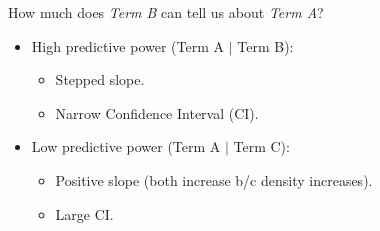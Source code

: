 \documentclass[aspectratio=169, 9pt]{beamer}
\begin{document}
\begin{frame}[c]
	
	\begin{minipage}[t]{.48\linewidth}
	\large\alert{How much does \textit{Term B} can tell us about \textit{Term A}?}\normalsize\pause
	
	\begin{itemize}
		\item<2-> High predictive power (Term A $|$ Term B):
		\begin{itemize}
			\item<3-> Stepped slope.
			\item<3-> Narrow Confidence Interval (CI).
		\end{itemize}
		\item<4-> Low predictive power (Term A $|$ Term C):
		\begin{itemize}
			\item<5-> Positive slope (both increase b/c density increases).
			\item<5-> Large CI.
		\end{itemize}
	\end{itemize}
	\end{minipage}
\hfill
	\begin{minipage}[t]{.48\linewidth}
	\begin{figure}
\end{figure}
\end{minipage}
\end{frame}
\end{document}
